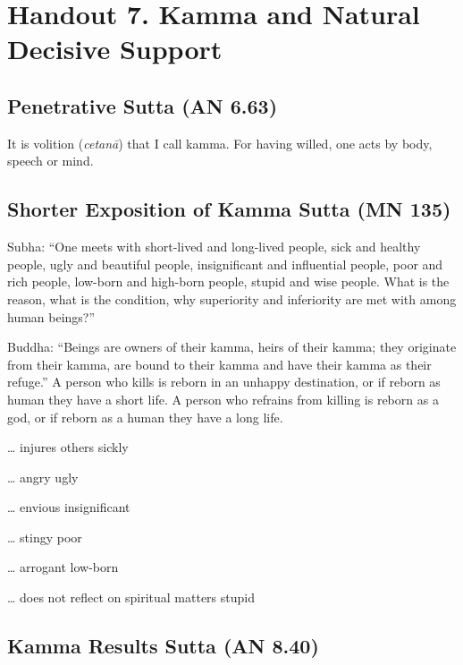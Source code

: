\documentclass[a4 paper, 12pt]{article}
\begin{document}
\pagestyle{empty}

\section*{Handout 7. Kamma and Natural Decisive Support}

\subsection*{Penetrative Sutta (AN 6.63)}

It is volition (\textit{cetanā}) that I call kamma. For having willed, one acts by body, speech or mind.

\subsection*{Shorter Exposition of Kamma Sutta (MN 135)}

Subha: “One meets with short-lived and long-lived people, sick and healthy people, ugly and beautiful people, insignificant and influential people, poor and rich people, low-born and high-born people, stupid and wise people. What is the reason, what is the condition, why superiority and inferiority are met with among human beings?”

Buddha: “Beings are owners of their kamma, heirs of their kamma; they originate from their kamma, are bound to their kamma and have their kamma as their refuge.”
A person who kills is reborn in an unhappy destination, or if reborn as human they have a short life. A person who refrains from killing is reborn as a god, or if reborn as a human they have a long life.

… injures others \textrightarrow \hspace{1mm} sickly

… angry \textrightarrow \hspace{1mm} ugly

… envious \textrightarrow \hspace{1mm} insignificant

… stingy \textrightarrow \hspace{1mm} poor

… arrogant \textrightarrow \hspace{1mm} low-born

… does not reflect on spiritual matters \textrightarrow \hspace{1mm} stupid

\subsection*{Kamma Results Sutta (AN 8.40)}
\end{document}
